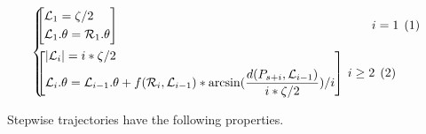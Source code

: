 \begin{small}
\vspace{-1ex}
\begin{equation*}
\hspace{-1.5ex} \left\{
    \begin{aligned}
        &\hspace{-1.5ex}\left[
            \begin{aligned}
            & \mathcal{L}_{1} = {\zeta}/{2}\\
            & \mathcal{L}_{1}.\theta = \mathcal{R}_{1}.\theta\\
             \end{aligned}
        \right]\hspace{46.5ex}~i=1\hspace{1ex}(1)\\
        &\hspace{-1.5ex}\left[
            \begin{aligned}
            & |\mathcal{L}_{i}|  = i*{\zeta}/{2}\\
            & \mathcal{L}_{i}.\theta = \mathcal{L}_{i-1}.\theta + f(\mathcal{R}_i,\mathcal{L}_{i-1})*\arcsin(\frac{d(P_{s+i}, \mathcal{L}_{i-1})}{i*\zeta/2})/i \\	
            \end{aligned}
        \right]\hspace{.5ex}i\ge 2\hspace{1ex}(2)~ \\
    \end{aligned}
    \right.
\end{equation*}
\vspace{-1ex}
\end{small}


Stepwise trajectories have the following properties.


